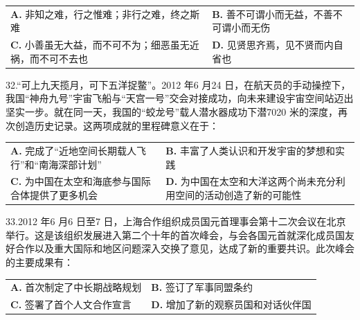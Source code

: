 \documentclass[UTF8,11pt]{ctexart}
\begin{document}
\begin{center}\begin{tabular}{>{\raggedright\arraybackslash}p{\dimexpr(\linewidth-4\tabcolsep)/2\relax}>{\raggedright\arraybackslash}p{\dimexpr(\linewidth-4\tabcolsep)/2\relax}}
\textbf{A.} 非知之难，行之惟难；非行之难，终之斯难 & \textbf{B.} 善不可谓小而无益，不善不可谓小而无伤\\[.35em]
\textbf{C.} 小善虽无大益，而不可不为；细恶虽无近祸，而不可不去也 & \textbf{D.} 见贤思齐焉，见不贤而内自省也\\[.35em]\end{tabular}\end{center}

32.“可上九天揽月，可下五洋捉鳖”。2012 年6 月24 日，在航天员的手动操控下，我国“神舟九号”宇宙飞船与“天宫一号”交会对接成功，向未来建设宇宙空间站迈出坚实一步。就在同一天，我国的“蛟龙号”载人潜水器成功下潜7020 米的深度，再次创造历史记录。这两项成就的里程碑意义在于：


\begin{center}\begin{tabular}{>{\raggedright\arraybackslash}p{\dimexpr(\linewidth-4\tabcolsep)/2\relax}>{\raggedright\arraybackslash}p{\dimexpr(\linewidth-4\tabcolsep)/2\relax}}
\textbf{A.} 完成了“近地空间长期载人飞行”和“南海深部计划” & \textbf{B.} 丰富了人类认识和开发宇宙的梦想和实践\\[.35em]
\textbf{C.} 为中国在太空和海底参与国际合体提供了更多机会 & \textbf{D.} 为中国在太空和大洋这两个尚未充分利用空间的活动创造了新的可能性\\[.35em]\end{tabular}\end{center}

33.2012 年6 月6 日至7 日，上海合作组织成员国元首理事会第十二次会议在北京举行。这是该组织发展进入第二个十年的首次峰会，与会各国元首就深化成员国友好合作以及重大国际和地区问题深入交换了意见，达成了新的重要共识。此次峰会的主要成果有：


\begin{center}\begin{tabular}{>{\raggedright\arraybackslash}p{\dimexpr(\linewidth-4\tabcolsep)/2\relax}>{\raggedright\arraybackslash}p{\dimexpr(\linewidth-4\tabcolsep)/2\relax}}
\textbf{A.} 首次制定了中长期战略规划 & \textbf{B.} 签订了军事同盟条约\\[.35em]
\textbf{C.} 签署了首个人文合作宣言 & \textbf{D.} 增加了新的观察员国和对话伙伴国\\[.35em]\end{tabular}\end{center}
\end{document}

